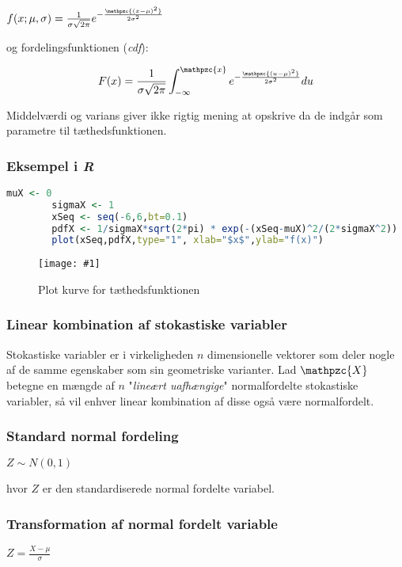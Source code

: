 \documentclass{article}
\newcommand{\mellemrum}{\vspace{2 ex}}
\newcommand{\pic}[3]{\begin{figure}[H]
		\centering
		\texttt{[image: \#1]}
		
		\caption{#2}
\end{figure}}
\newcommand{\cent}[1]{ \mellemrum \begin{center} #1\end{center} \mellemrum }
\newcommand{\script}[1]{\mathpzc{#1}}
\begin{document}
	\cent{$ f(x;\mu,\sigma) = \frac{1}{\sigma \sqrt{2\pi}}e^{-\frac{\script{(x-\mu)^2}}{2\sigma^2}} $}
	
	og fordelingsfunktionen (\textit{cdf}):
	
	\cent{$$ F(x) = \frac{1}{\sigma \sqrt{2\pi}} \int_{-\infty}^{\script{x}} e^{-\frac{\script{(u-\mu)^2}}{2\sigma^2}} du $$}
	
	Middelværdi og varians giver ikke rigtig mening at opskrive da de indgår som parametre til tæthedsfunktionen.
	
	\subsubsection*{Eksempel i \textit{R}}
	
	\begin{lstlisting}[language=R]
		muX <- 0
		sigmaX <- 1
		xSeq <- seq(-6,6,bt=0.1)
		pdfX <- 1/sigmaX*sqrt(2*pi) * exp(-(xSeq-muX)^2/(2*sigmaX^2))
		plot(xSeq,pdfX,type="1", xlab="$x$",ylab="f(x)")\end{lstlisting}
	
	\pic{NormalPlot.jpg}{Plot kurve for tæthedsfunktionen}{200px}
	
	\subsubsection{Linear kombination af stokastiske variabler}
	
	Stokastiske variabler er i virkeligheden $n$ dimensionelle vektorer som deler nogle af de samme egenskaber som sin geometriske varianter. Lad $\script{X}$ betegne en mængde af $n$ "\textit{lineært uafhængige}" normalfordelte stokastiske variabler, så vil enhver linear kombination af disse også være normalfordelt.
	
	\subsubsection{Standard normal fordeling}
	
	\cent{$ Z \sim N(0,1) $}
	
	hvor $Z$ er den standardiserede normal fordelte variabel.
	
	\subsubsection{Transformation af normal fordelt variable}
	
	\cent{$ Z = \frac{X-\mu}{\sigma} $}
	
\end{document}
